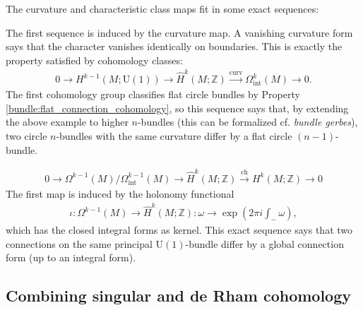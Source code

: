     The curvature and characteristic class maps fit in some exact sequences:
    \begin{property}
        The first sequence is induced by the curvature map. A vanishing curvature form says that the character vanishes identically on boundaries. This is exactly the property satisfied by cohomology classes:
        \begin{gather}
            0\longrightarrow H^{k-1}(M;\mathrm{U}(1))\longrightarrow\hat{H}^k(M;\mathbb{Z})\overset{\mathrm{curv}}{\longrightarrow}\Omega^k_\mathrm{int}(M)\longrightarrow0.
        \end{gather}
        The first cohomology group classifies flat circle bundles by Property \ref{bundle:flat_connection_cohomology}, so this sequence says that, by extending the above example to higher $n$-bundles (this can be formalized cf. \textit{bundle gerbes}), two circle $n$-bundles with the same curvature differ by a flat circle $(n-1)$-bundle.
    \end{property}
    \begin{property}
        \begin{gather}
            0\longrightarrow \Omega^{k-1}(M)/\Omega^{k-1}_\mathrm{int}(M)\longrightarrow\hat{H}^k(M;\mathbb{Z})\overset{\mathrm{ch}}{\longrightarrow} H^k(M;\mathbb{Z})\longrightarrow0
        \end{gather}
        The first map is induced by the holonomy functional
        \begin{gather}
            \iota:\Omega^{k-1}(M)\rightarrow\hat{H}^k(M;\mathbb{Z}):\omega\rightarrow\exp\left(2\pi i\int_-\omega\right),
        \end{gather}
        which has the closed integral forms as kernel. This exact sequence says that two connections on the same principal $\mathrm{U}(1)$-bundle differ by a global connection form (up to an integral form).
    \end{property}

\subsection{Combining singular and de Rham cohomology}

